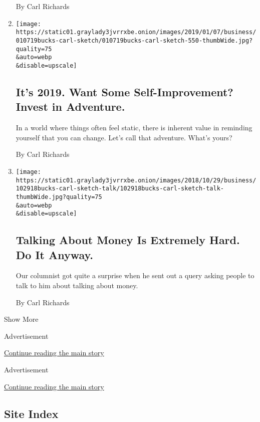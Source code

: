 \begin{enumerate}
  By Carl Richards
\item
  \href{/2019/01/07/your-money/2019-self-improvement-adventure.html}{}

  \texttt{[image: https://static01.graylady3jvrrxbe.onion/images/2019/01/07/business/010719bucks-carl-sketch/010719bucks-carl-sketch-550-thumbWide.jpg?quality=75\\\&auto=webp\\\&disable=upscale]}

  \hypertarget{its-2019-want-some-self-improvement-invest-in-adventure}{%
  \subsection{It's 2019. Want Some Self-Improvement? Invest in
  Adventure.}\label{its-2019-want-some-self-improvement-invest-in-adventure}}

  In a world where things often feel static, there is inherent value in
  reminding yourself that you can change. Let's call that adventure.
  What's yours?

  By Carl Richards
\item
  \href{/2018/12/17/your-money/how-to-talk-about-money-with-spouse.html}{}

  \texttt{[image: https://static01.graylady3jvrrxbe.onion/images/2018/10/29/business/102918bucks-carl-sketch-talk/102918bucks-carl-sketch-talk-thumbWide.jpg?quality=75\\\&auto=webp\\\&disable=upscale]}

  \hypertarget{talking-about-money-is-extremely-hard-do-it-anyway}{%
  \subsection{Talking About Money Is Extremely Hard. Do It
  Anyway.}\label{talking-about-money-is-extremely-hard-do-it-anyway}}

  Our columnist got quite a surprise when he sent out a query asking
  people to talk to him about talking about money.

  By Carl Richards
\end{enumerate}

Show More

Advertisement

\protect\hyperlink{after-mid1}{Continue reading the main story}

Advertisement

\protect\hyperlink{after-mktg}{Continue reading the main story}

\hypertarget{site-index}{%
\subsection{Site Index}\label{site-index}}

